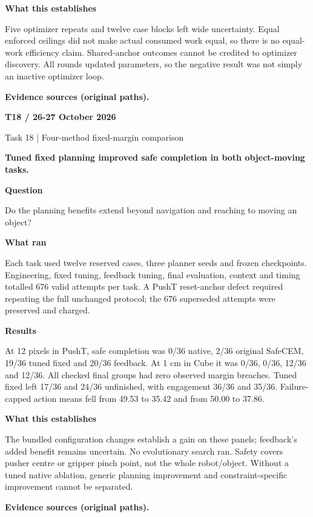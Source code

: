 \documentclass[11pt,a4paper]{article}
\newcommand{\block}[2]{\par\textbf{\color{ink}#1}\par\nopagebreak #2\par}
\newcommand{\finding}[1]{\begin{tcolorbox}[colback=pale,colframe=pale,boxrule=0pt,arc=1mm,left=10pt,right=10pt,top=10pt,bottom=10pt]\color{ink}\large\bfseries #1\end{tcolorbox}}
\begin{document}
\block{What this establishes}{Five optimizer repeats and twelve case blocks left wide uncertainty. Equal enforced ceilings did not make actual consumed work equal, so there is no equal-work efficiency claim. Shared-anchor outcomes cannot be credited to optimizer discovery. All rounds updated parameters, so the negative result was not simply an inactive optimizer loop.}
\vfill{\footnotesize\color{muted}\textbf{Evidence sources (original paths).}\par
\raggedright {}\par {}\par {}}
\clearpage
{}\label{exp:T18}
{\color{accent}\small\bfseries T18 / 26-27 October 2026}\par
{}\par
{\color{muted}\small Task 18 | Four-method fixed-margin comparison}\par\vspace{2mm}
\finding{Tuned fixed planning improved safe completion in both object-moving tasks.}
\block{Question}{Do the planning benefits extend beyond navigation and reaching to moving an object?}
\block{What ran}{Each task used twelve reserved cases, three planner seeds and frozen checkpoints. Engineering, fixed tuning, feedback tuning, final evaluation, context and timing totalled 676 valid attempts per task. A PushT reset-anchor defect required repeating the full unchanged protocol; the 676 superseded attempts were preserved and charged.}
\block{Results}{At 12 pixels in PushT, safe completion was 0/36 native, 2/36 original SafeCEM, 19/36 tuned fixed and 20/36 feedback. At 1 cm in Cube it was 0/36, 0/36, 12/36 and 12/36. All checked final groups had zero observed margin breaches. Tuned fixed left 17/36 and 24/36 unfinished, with engagement 36/36 and 35/36. Failure-capped action means fell from 49.53 to 35.42 and from 50.00 to 37.86.}
\block{What this establishes}{The bundled configuration changes establish a gain on these panels; feedback's added benefit remains uncertain. No evolutionary search ran. Safety covers pusher centre or gripper pinch point, not the whole robot/object. Without a tuned native ablation, generic planning improvement and constraint-specific improvement cannot be separated.}
\vfill{\footnotesize\color{muted}\textbf{Evidence sources (original paths).}\par
\raggedright {}\par {}\par {}}
\end{document}
